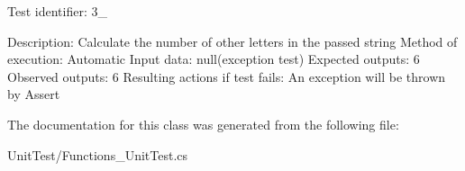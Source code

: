Test identifier\+: 3\+\_ \begin{DoxyVerb}            Description:                        Calculate the number of other letters in the passed string   
            Method of execution:                Automatic  
            Input data:                         null(exception test)   
            Expected outputs:                   6   
            Observed outputs:                   6   
            Resulting actions if test fails:    An exception will be thrown by Assert    \end{DoxyVerb}
 

The documentation for this class was generated from the following file\+:\begin{DoxyCompactItemize}
\item 
Unit\+Test/Functions\+\_\+\+Unit\+Test.\+cs\end{DoxyCompactItemize}
